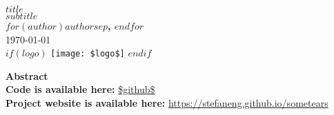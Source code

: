 \vspace{6em}
\begin{center}
    {\Large \textbf{$title$}} \\[1em]
    {\large $subtitle$} \\[1em]
    \textbf{$for(author)$$author$$sep$, $endfor$} \\[1em]
    \today \\[1em]
    $if(logo)$
    \texttt{[image: \$logo\$]}
    $endif$
\end{center}
\textbf{Abstract} \\[1em]
\textbf{Code is available here: } \url{$github$} \\[1em]
\textbf{Project website is available here: } \url{https://stefaneng.github.io/sometears} \\[1em]


\newpage
